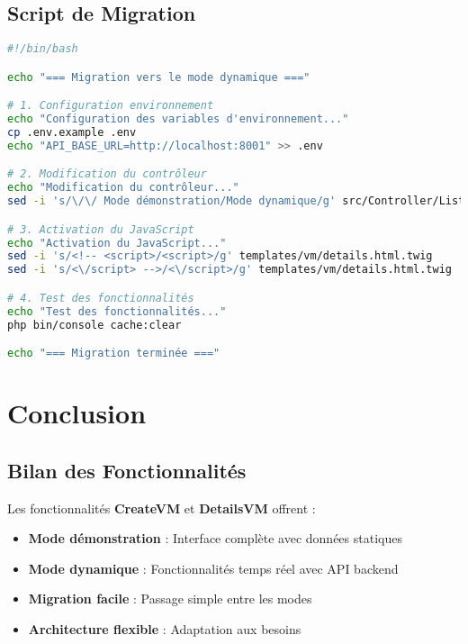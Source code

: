 \documentclass[12pt,a4paper]{report}
\begin{document}
\section{Script de Migration}

\begin{lstlisting}[language=bash, caption=Script de migration automatique]
#!/bin/bash

echo "=== Migration vers le mode dynamique ==="

# 1. Configuration environnement
echo "Configuration des variables d'environnement..."
cp .env.example .env
echo "API_BASE_URL=http://localhost:8001" >> .env

# 2. Modification du contrôleur
echo "Modification du contrôleur..."
sed -i 's/\/\/ Mode démonstration/Mode dynamique/g' src/Controller/ListVMsController.php

# 3. Activation du JavaScript
echo "Activation du JavaScript..."
sed -i 's/<!-- <script>/<script>/g' templates/vm/details.html.twig
sed -i 's/<\/script> -->/<\/script>/g' templates/vm/details.html.twig

# 4. Test des fonctionnalités
echo "Test des fonctionnalités..."
php bin/console cache:clear

echo "=== Migration terminée ==="
\end{lstlisting}

\chapter{Conclusion}

\section{Bilan des Fonctionnalités}

Les fonctionnalités \textbf{CreateVM} et \textbf{DetailsVM} offrent :

\begin{itemize}
    \item \textbf{Mode démonstration} : Interface complète avec données statiques
    \item \textbf{Mode dynamique} : Fonctionnalités temps réel avec API backend
    \item \textbf{Migration facile} : Passage simple entre les modes
    \item \textbf{Architecture flexible} : Adaptation aux besoins
\end{itemize}
\end{document}
